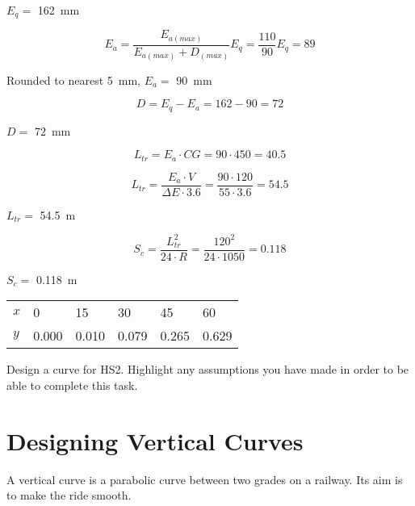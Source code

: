 \documentclass{bcrre_exam}
\begin{document}
\begin{questions}
\begin{solution}
$E_q=$ \qty{162}{mm}

\begin{equation}
    E_a=\frac{E_{a(max)}}{E_{a(max)}+D_{(max)}}E_q = \frac{110}{90}E_q = 89
\end{equation}

Rounded to nearest \qty{5}{mm}, $E_a=$ \qty{90}{mm}

\begin{equation}
    D=E_q-E_a=162-90=72
\end{equation}

$D=$ \qty{72}{mm}

\begin{equation}
    L_{tr}=E_a \cdot CG = 90 \cdot 450 = 40.5
\end{equation}

\begin{equation}
    L_{tr} = \frac{E_a \cdot V}{\Delta E \cdot 3.6} = \frac{90 \cdot 120}{55 \cdot 3.6} = 54.5
\end{equation}

$L_{tr}=$ \qty{54.5}{m}

\begin{equation}
    S_c=\frac{L_{tr}^2}{24 \cdot R} = \frac{120^2}{24 \cdot 1050} = 0.118
\end{equation}

$S_c=$ \qty{0.118}{m}

\vspace{1cm}

\begin{tabular}{@{}llllll@{}}
\toprule
$x$ & \num{0}     & \num{15}    & \num{30}    & \num{45}    & \num{60}    \\ 
$y$ & \num{0.000} & \num{0.010} & \num{0.079} & \num{0.265} & \num{0.629} \\ \bottomrule
\end{tabular}

\end{solution}

\question Design a curve for HS2. Highlight any assumptions you have made in order to be able to complete this task. 

\end{questions}

\newpage
\section{Designing Vertical Curves}

A vertical curve is a parabolic curve between two grades on a railway. Its aim is to make the ride smooth.
\end{document}

